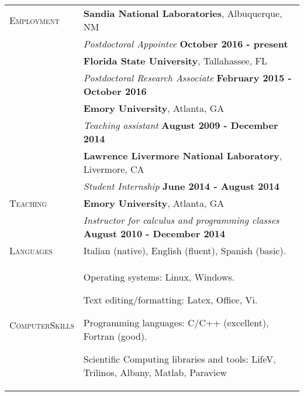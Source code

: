 \documentclass[10pt]{article}
\begin{document}
\begin{tabular}{p{2.5cm}|p{15.5cm}}
\\
\textsc{Employment} &

\textbf{Sandia National Laboratories}, Albuquerque, NM\\
& \textit{Postdoctoral Appointee} \hspace*{7.5cm} \textbf{October 2016 - present}

\\
&\textbf{Florida State University}, Tallahassee, FL\\
& \textit{Postdoctoral Research Associate} \hspace*{5.1cm} \textbf{February 2015 - October 2016}

\\
&\textbf{Emory University}, Atlanta, GA\\
& \textit{Teaching assistant} \hspace*{7.2cm} \textbf{August 2009 - December 2014}

\\
&\textbf{Lawrence Livermore National Laboratory}, Livermore, CA\\
& \textit{Student Internship} \hspace*{8cm} \textbf{June 2014 - August 2014}

\\
\textsc{Teaching}
 & \textbf{Emory University}, Atlanta, GA\\
 & \textit{Instructor for calculus and programming classes} \hspace*{2.5cm} \textbf{August 2010 - December 2014}

\\
\textsc{Languages} & Italian (native), English (fluent), Spanish (basic).

\\
\textsc{Computer\linebreak Skills} &

Operating systems: Linux, Windows.

Text editing/formatting: Latex, Office, Vi.

Programming languages: C/C++ (excellent), Fortran (good).

Scientific Computing libraries and tools: LifeV, Trilinos, Albany, Matlab, Paraview





\end{tabular}
\end{document}
